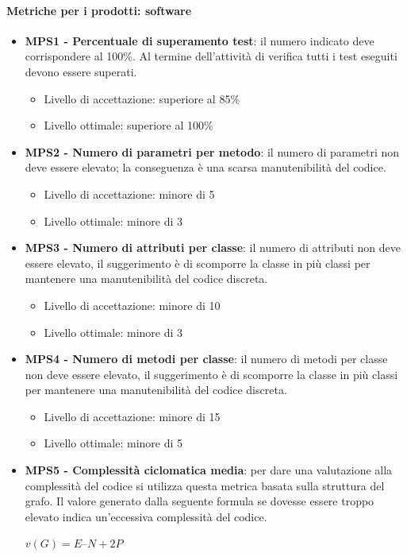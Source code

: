 	\paragraph{Metriche per i prodotti: software} 
	\begin{itemize}
		\item \textbf{MPS1 - Percentuale di superamento test}: il numero indicato deve corrispondere al 100\%. Al termine dell'attività di verifica tutti i test eseguiti devono essere superati.
		\begin{itemize}
	 \item Livello di accettazione: superiore al 85\%
	 \item Livello ottimale: superiore al 100\%
	 \end{itemize}
	    \item \textbf{MPS2 - Numero di parametri per metodo}: il numero di parametri non deve essere elevato; la conseguenza è una scarsa manutenibilità del codice.
	    \begin{itemize}
	 \item Livello di accettazione: minore di 5
	 \item Livello ottimale: minore di 3
	 \end{itemize}
	    \item \textbf{MPS3 - Numero di attributi per classe}: il numero di attributi non deve essere elevato, il suggerimento è di scomporre la classe in più classi per mantenere una manutenibilità del codice discreta.
	    \begin{itemize}
	 \item Livello di accettazione: minore di 10
	 \item Livello ottimale: minore di 3
	 \end{itemize}
	    \item \textbf{MPS4 - Numero di metodi per classe}: il numero di metodi per classe non deve essere elevato, il suggerimento è di scomporre la classe in più classi per mantenere una manutenibilità del codice discreta.
	      \begin{itemize}
	 \item Livello di accettazione: minore di 15
	 \item Livello ottimale: minore di 5
	 \end{itemize}
	    \item \textbf{MPS5 - Complessità ciclomatica media}: per dare una valutazione alla complessità del codice si utilizza questa metrica basata sulla struttura del grafo. Il valore generato dalla seguente formula se dovesse essere troppo elevato indica un'eccessiva complessità del codice.
		\begin{center}
		$v(G) = E – N + 2P$
		\end{center}
    	

\end{itemize}
